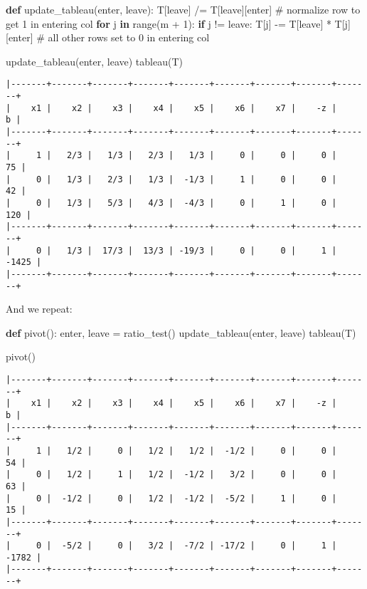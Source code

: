 \documentclass[
  letterpaper,
  DIV=11,
  numbers=noendperiod]{scrartcl}
\newenvironment{Shaded}{\begin{snugshade}}{\end{snugshade}}
\newcommand{\BuiltInTok}[1]{\textcolor[rgb]{0.00,0.23,0.31}{#1}}
\newcommand{\CommentTok}[1]{\textcolor[rgb]{0.37,0.37,0.37}{#1}}
\newcommand{\ControlFlowTok}[1]{\textcolor[rgb]{0.00,0.23,0.31}{\textbf{#1}}}
\newcommand{\DecValTok}[1]{\textcolor[rgb]{0.68,0.00,0.00}{#1}}
\newcommand{\KeywordTok}[1]{\textcolor[rgb]{0.00,0.23,0.31}{\textbf{#1}}}
\newcommand{\NormalTok}[1]{\textcolor[rgb]{0.00,0.23,0.31}{#1}}
\newcommand{\OperatorTok}[1]{\textcolor[rgb]{0.37,0.37,0.37}{#1}}
\begin{document}
\begin{Shaded}
\begin{Highlighting}[]
\KeywordTok{def}\NormalTok{ update\_tableau(enter, leave):}
\NormalTok{    T[leave] }\OperatorTok{/=}\NormalTok{ T[leave][enter] }\CommentTok{\# normalize row to get 1 in entering col}
    \ControlFlowTok{for}\NormalTok{ j }\KeywordTok{in} \BuiltInTok{range}\NormalTok{(m }\OperatorTok{+} \DecValTok{1}\NormalTok{):}
        \ControlFlowTok{if}\NormalTok{ j }\OperatorTok{!=}\NormalTok{ leave:}
\NormalTok{            T[j] }\OperatorTok{{-}=}\NormalTok{ T[leave] }\OperatorTok{*}\NormalTok{ T[j][enter] }\CommentTok{\# all other rows set to 0 in entering col}

\NormalTok{update\_tableau(enter, leave)}
\NormalTok{tableau(T)}
\end{Highlighting}
\end{Shaded}

\begin{verbatim}
|-------+-------+-------+-------+-------+-------+-------+-------+-------+
|    x1 |    x2 |    x3 |    x4 |    x5 |    x6 |    x7 |    -z |     b |
|-------+-------+-------+-------+-------+-------+-------+-------+-------+
|     1 |   2/3 |   1/3 |   2/3 |   1/3 |     0 |     0 |     0 |    75 |
|     0 |   1/3 |   2/3 |   1/3 |  -1/3 |     1 |     0 |     0 |    42 |
|     0 |   1/3 |   5/3 |   4/3 |  -4/3 |     0 |     1 |     0 |   120 |
|-------+-------+-------+-------+-------+-------+-------+-------+-------+
|     0 |   1/3 |  17/3 |  13/3 | -19/3 |     0 |     0 |     1 | -1425 |
|-------+-------+-------+-------+-------+-------+-------+-------+-------+
\end{verbatim}

And we repeat:

\begin{Shaded}
\begin{Highlighting}[]
\KeywordTok{def}\NormalTok{ pivot():}
\NormalTok{    enter, leave }\OperatorTok{=}\NormalTok{ ratio\_test()}
\NormalTok{    update\_tableau(enter, leave)}
\NormalTok{    tableau(T)}

\NormalTok{pivot()}
\end{Highlighting}
\end{Shaded}

\begin{verbatim}
|-------+-------+-------+-------+-------+-------+-------+-------+-------+
|    x1 |    x2 |    x3 |    x4 |    x5 |    x6 |    x7 |    -z |     b |
|-------+-------+-------+-------+-------+-------+-------+-------+-------+
|     1 |   1/2 |     0 |   1/2 |   1/2 |  -1/2 |     0 |     0 |    54 |
|     0 |   1/2 |     1 |   1/2 |  -1/2 |   3/2 |     0 |     0 |    63 |
|     0 |  -1/2 |     0 |   1/2 |  -1/2 |  -5/2 |     1 |     0 |    15 |
|-------+-------+-------+-------+-------+-------+-------+-------+-------+
|     0 |  -5/2 |     0 |   3/2 |  -7/2 | -17/2 |     0 |     1 | -1782 |
|-------+-------+-------+-------+-------+-------+-------+-------+-------+
\end{verbatim}
\end{document}

